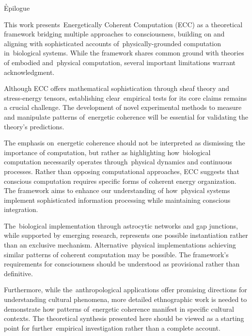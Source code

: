 \h{Epilogue}

This work presents~Energetically Coherent Computation (ECC) as a theoretical framework bridging multiple approaches to consciousness, building on and aligning with sophisticated accounts of~physically-grounded computation in~biological systems. While the framework shares common ground with theories of embodied and~physical computation, several important limitations warrant acknowledgment.

Although ECC offers mathematical sophistication through sheaf theory and stress-energy tensors, establishing clear~empirical tests for its core claims remains a crucial challenge. The development of novel experimental methods to measure and manipulate patterns of~energetic coherence will be essential for validating the theory's predictions.

The emphasis on~energetic coherence should not be interpreted as dismissing the importance of computation, but rather as highlighting how~biological computation necessarily operates through~physical dynamics and continuous processes. Rather than opposing computational approaches, ECC suggests that conscious computation requires specific forms of coherent energy organization. The framework aims to enhance our understanding of how~physical systems implement sophisticated information processing while maintaining conscious integration.

The~biological implementation through astrocytic networks and gap junctions, while supported by emerging research, represents one possible instantiation rather than an exclusive mechanism. Alternative~physical implementations achieving similar patterns of coherent computation may be possible. The framework's requirements for consciousness should be understood as provisional rather than definitive.

Furthermore, while the~anthropological applications offer promising directions for understanding cultural phenomena, more detailed ethnographic work is needed to demonstrate how patterns of~energetic coherence manifest in specific cultural contexts. The theoretical synthesis presented here should be viewed as a starting point for further~empirical investigation rather than a complete account.